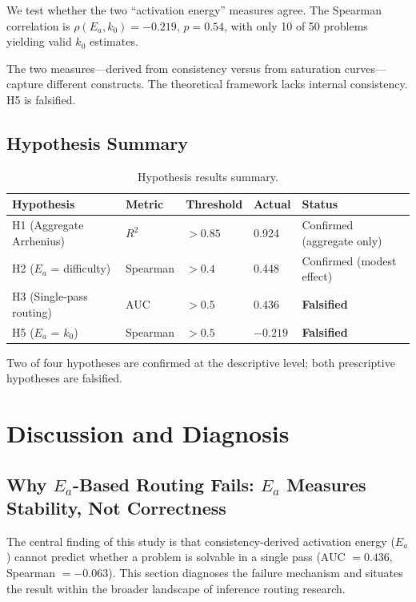 \documentclass{article}
\begin{document}
We test whether the two ``activation energy'' measures agree. The Spearman correlation is $\rho(E_a, k_0) = -0.219$, $p = 0.54$, with only 10 of 50 problems yielding valid $k_0$ estimates.

The two measures---derived from consistency versus from saturation curves---capture different constructs. The theoretical framework lacks internal consistency. H5 is falsified.

\subsection{Hypothesis Summary}

\begin{table}[t]
\caption{Hypothesis results summary.}
\label{tab:summary}
\centering
\begin{tabular}{lllll}
\toprule
Hypothesis & Metric & Threshold & Actual & Status \\
\midrule
H1 (Aggregate Arrhenius) & $R^2$ & $> 0.85$ & 0.924 & Confirmed (aggregate only) \\
H2 ($E_a$ = difficulty) & Spearman & $> 0.4$ & 0.448 & Confirmed (modest effect) \\
H3 (Single-pass routing) & AUC & $> 0.5$ & 0.436 & \textbf{Falsified} \\
H5 ($E_a$ = $k_0$) & Spearman & $> 0.5$ & $-0.219$ & \textbf{Falsified} \\
\bottomrule
\end{tabular}
\end{table}

Two of four hypotheses are confirmed at the descriptive level; both prescriptive hypotheses are falsified.

\section{Discussion and Diagnosis}
\label{sec:discussion}

\subsection{Why $E_a$-Based Routing Fails: $E_a$ Measures Stability, Not Correctness}

The central finding of this study is that consistency-derived activation energy ($E_a$) cannot predict whether a problem is solvable in a single pass (AUC $= 0.436$, Spearman $= -0.063$). This section diagnoses the failure mechanism and situates the result within the broader landscape of inference routing research.
\end{document}
